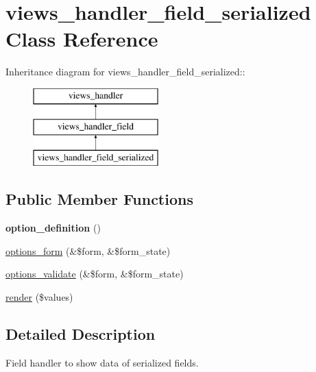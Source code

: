 \hypertarget{classviews__handler__field__serialized}{
\section{views\_\-handler\_\-field\_\-serialized Class Reference}
\label{classviews__handler__field__serialized}
}
Inheritance diagram for views\_\-handler\_\-field\_\-serialized::\begin{figure}[H]
\begin{center}
\leavevmode
\includegraphics[height=3cm]{classviews__handler__field__serialized}
\end{center}
\end{figure}
\subsection*{Public Member Functions}
\begin{DoxyCompactItemize}
\item 
\hypertarget{classviews__handler__field__serialized_ad4f243b966f884fb83b2ac0d316e63c0}{
{\bfseries option\_\-definition} ()}
\label{classviews__handler__field__serialized_ad4f243b966f884fb83b2ac0d316e63c0}

\item 
\hyperlink{classviews__handler__field__serialized_ab940381ab9cf20df4972dbf57e97d04e}{options\_\-form} (\&\$form, \&\$form\_\-state)
\item 
\hyperlink{classviews__handler__field__serialized_a1ad7ffa8d9ea1cb01fb69c47c29600f1}{options\_\-validate} (\&\$form, \&\$form\_\-state)
\item 
\hyperlink{classviews__handler__field__serialized_ad1ab783ff282f7d3af5e93e6debbc176}{render} (\$values)
\end{DoxyCompactItemize}


\subsection{Detailed Description}
Field handler to show data of serialized fields. 

